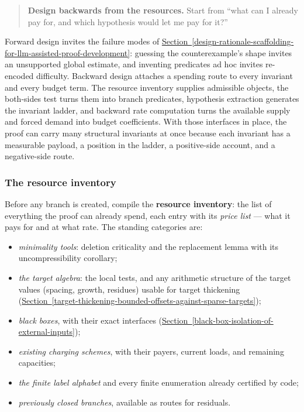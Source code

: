 \documentclass[
  11pt,
]{article}
\providecommand{\tightlist}{%
  \setlength{\itemsep}{0pt}\setlength{\parskip}{0pt}}
\theoremstyle{definition}
\newcommand{\secref}[1]{\hyperref[#1]{Section~\ref*{#1}}}
\begin{document}
\begin{quote}
\textbf{Design backwards from the resources.} Start from ``what can I
already pay for, and which hypothesis would let me pay for it?''
\end{quote}

Forward design invites the failure modes of \secref{design-rationale-scaffolding-for-llm-assisted-proof-development}: guessing the
counterexample's shape invites an unsupported global estimate, and
inventing predicates ad hoc invites re-encoded difficulty. Backward
design attaches a spending route to every invariant and every budget
term. The resource inventory supplies admissible objects, the both-sides
test turns them into branch predicates, hypothesis extraction generates
the invariant ladder, and backward rate computation turns the available
supply and forced demand into budget coefficients. With those interfaces
in place, the proof can carry many structural invariants at once because
each invariant has a measurable payload, a position in the ladder, a
positive-side account, and a negative-side route.

\subsubsection{The resource
inventory}\label{the-resource-inventory}

Before any branch is created, compile the \textbf{resource inventory}:
the list of everything the proof can already spend, each entry with its
\emph{price list} --- what it pays for and at what rate. The standing
categories are:

\begin{itemize}
\tightlist
\item
  \emph{minimality tools}: deletion criticality and the replacement
  lemma with its uncompressibility corollary;
\item
  \emph{the target algebra}: the local tests, and any arithmetic
  structure of the target values (spacing, growth, residues) usable for
  target thickening (\secref{target-thickening-bounded-offsets-against-sparse-targets});
\item
  \emph{black boxes}, with their exact interfaces (\secref{black-box-isolation-of-external-inputs});
\item
  \emph{existing charging schemes}, with their payers, current loads,
  and remaining capacities;
\item
  \emph{the finite label alphabet} and every finite enumeration already
  certified by code;
\item
  \emph{previously closed branches}, available as routes for residuals.
\end{itemize}
\end{document}
